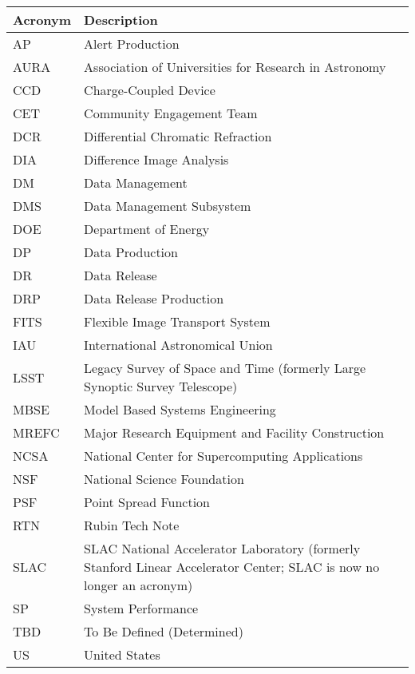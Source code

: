 \addtocounter{table}{-1}
\begin{longtable}{p{}p{}}\hline
\textbf{Acronym} & \textbf{Description}  \\\hline

AP & Alert Production \\\hline
AURA & Association of Universities for Research in Astronomy \\\hline
CCD & Charge-Coupled Device \\\hline
CET & Community Engagement Team \\\hline
DCR & Differential Chromatic Refraction \\\hline
DIA & Difference Image Analysis \\\hline
DM & Data Management \\\hline
DMS & Data Management Subsystem \\\hline
DOE & Department of Energy \\\hline
DP & Data Production \\\hline
DR & Data Release \\\hline
DRP & Data Release Production \\\hline
FITS & Flexible Image Transport System \\\hline
IAU & International Astronomical Union \\\hline
LSST & Legacy Survey of Space and Time (formerly Large Synoptic Survey Telescope) \\\hline
MBSE & Model Based Systems Engineering \\\hline
MREFC & Major Research Equipment and Facility Construction \\\hline
NCSA & National Center for Supercomputing Applications \\\hline
NSF & National Science Foundation \\\hline
PSF & Point Spread Function \\\hline
RTN & Rubin Tech Note \\\hline
SLAC & SLAC National Accelerator Laboratory (formerly Stanford Linear Accelerator Center; SLAC is now no longer an acronym) \\\hline
SP & System Performance \\\hline
TBD & To Be Defined (Determined) \\\hline
US & United States \\\hline
\end{longtable}
